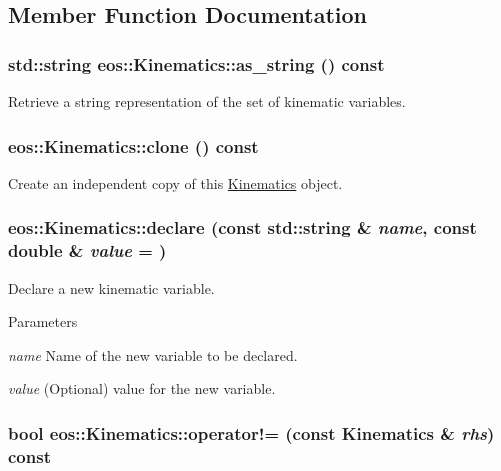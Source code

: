 \subsection{Member Function Documentation}
\hypertarget{classeos_1_1Kinematics_a297facfe690f7f805d4af5e32b739af9}{
\subsubsection[{as\_\-string}]{\setlength{\rightskip}{0pt plus 5cm}std::string eos::Kinematics::as\_\-string () const}}
\label{classeos_1_1Kinematics_a297facfe690f7f805d4af5e32b739af9}
Retrieve a string representation of the set of kinematic variables. \hypertarget{classeos_1_1Kinematics_aedd9681136ab3735fb754e2840e10715}{
\subsubsection[{clone}]{ eos::Kinematics::clone () const}}
\label{classeos_1_1Kinematics_aedd9681136ab3735fb754e2840e10715}
Create an independent copy of this \hyperlink{classeos_1_1Kinematics}{Kinematics} object. \hypertarget{classeos_1_1Kinematics_a0db9fd05c920dae2e0b0556dba0ebb08}{
\subsubsection[{declare}]{ eos::Kinematics::declare (const std::string \& {\em name}, \/  const double \& {\em value} = {})}}
\label{classeos_1_1Kinematics_a0db9fd05c920dae2e0b0556dba0ebb08}
Declare a new kinematic variable.


\begin{DoxyParams}{Parameters}
\item[{\em name}]Name of the new variable to be declared. \item[{\em value}](Optional) value for the new variable. \end{DoxyParams}
\hypertarget{classeos_1_1Kinematics_a20f3e18e4c4157196d7c384ae2f2f2d7}{
\subsubsection[{operator!=}]{\setlength{\rightskip}{0pt plus 5cm}bool eos::Kinematics::operator!= (const {\bf Kinematics} \& {\em rhs}) const}}
\label{classeos_1_1Kinematics_a20f3e18e4c4157196d7c384ae2f2f2d7}


